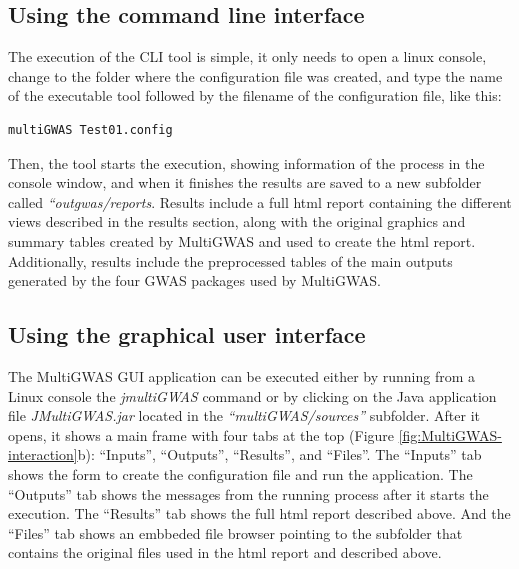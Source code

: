 \documentclass{article}
\begin{document}
\subsection{Using the command line interface}

The execution of the CLI tool is simple, it only needs to open a linux console, change to the folder where the configuration file was created, and type the name of the executable tool followed by the filename of the configuration file, like this:

\begin{lstlisting}[language=bash,basicstyle={\small}]
multiGWAS Test01.config
\end{lstlisting}

Then, the tool starts the execution, showing information of the process in the console window, and when it finishes the results are saved to a new subfolder called \emph{``outgwas/reports}. Results include a full html report containing the different views described in the results section, along with the original graphics and summary tables created by MultiGWAS and used to create the html report. Additionally, results include the preprocessed tables of the main outputs generated by the four GWAS packages used by MultiGWAS.

\subsection{Using the graphical user interface}
The MultiGWAS GUI application can be executed either by running from a Linux console the \emph{jmultiGWAS} command or by clicking on the Java application file \emph{JMultiGWAS.jar} located in the \emph{``multiGWAS/sources''} subfolder. After it opens, it shows a main frame with four tabs at the top (Figure \ref{fig:MultiGWAS-interaction}b): ``Inputs'', ``Outputs'', ``Results'', and ``Files''. The ``Inputs'' tab shows the form to create the configuration file and run the application. The ``Outputs'' tab shows the messages from the running process after it starts the execution. The ``Results'' tab shows the full html report described above. And the ``Files'' tab shows an embbeded file browser pointing to the subfolder that contains the original files used in the html report and described above.
\end{document}
